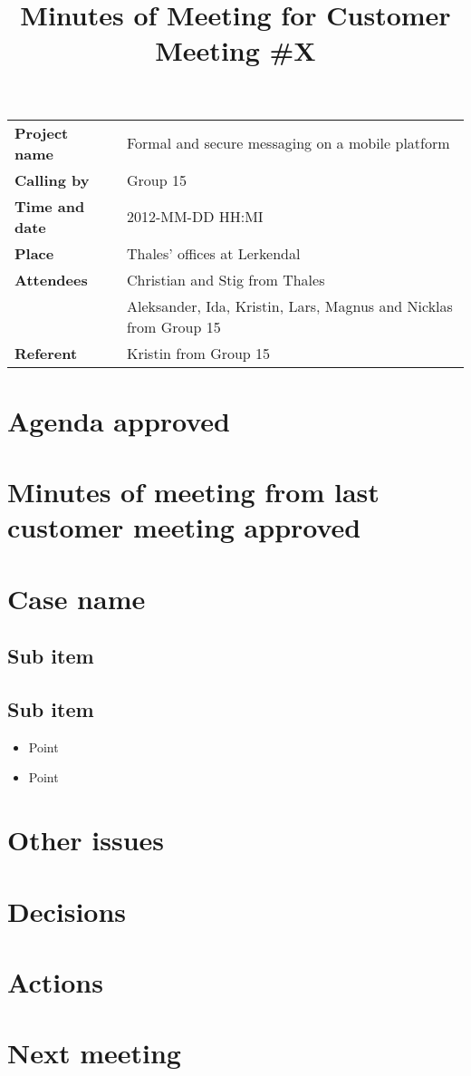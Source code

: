 \documentclass[a4paper,12pt]{article}
\begin{document}
\title{Minutes of Meeting for Customer Meeting \#X}
\maketitle
\begin{tabular}{>{\bfseries}l l}	
Project name&Formal and secure messaging on a mobile platform\\
Calling by&Group 15\\
Time and date&2012-MM-DD HH:MI\\
Place&Thales' offices at Lerkendal\\
Attendees&Christian and Stig from Thales\\
& Aleksander, Ida, Kristin, Lars, Magnus and Nicklas from Group 15 \\
Referent&Kristin from Group 15\\
\end{tabular}

\section{Agenda approved}
\section{Minutes of meeting from last customer meeting approved}
\section{Case name}
\subsection{Sub item}
\subsection{Sub item}
\begin{itemize}
\item
Point
\item
Point
\end{itemize}
\section{Other issues}
\section{Decisions}
\section{Actions}
\section{Next meeting}
\end{document}
